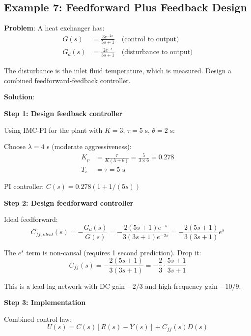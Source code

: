\subsection{Example 7: Feedforward Plus Feedback Design}
\label{subsec:ex_ff_fb}

\textbf{Problem}: A heat exchanger has:
\begin{align}
G(s) &= \frac{3e^{-2s}}{5s + 1} \quad \text{(control to output)} \\
G_d(s) &= \frac{2e^{-s}}{3s + 1} \quad \text{(disturbance to output)}
\end{align}

The disturbance is the inlet fluid temperature, which is measured. Design a combined feedforward-feedback controller.

\textbf{Solution}:

\textbf{Step 1: Design feedback controller}

Using IMC-PI for the plant with $K = 3$, $\tau = 5$ s, $\theta = 2$ s:

Choose $\lambda = 4$ s (moderate aggressiveness):
\begin{align}
K_p &= \frac{\tau}{K(\lambda + \theta)} = \frac{5}{3 \times 6} = 0.278 \\
T_i &= \tau = 5 \text{ s}
\end{align}

PI controller: $C(s) = 0.278(1 + 1/(5s))$

\textbf{Step 2: Design feedforward controller}

Ideal feedforward:
\begin{equation}
C_{ff,ideal}(s) = -\frac{G_d(s)}{G(s)} = -\frac{2(5s+1)e^{-s}}{3(3s+1)e^{-2s}} = -\frac{2(5s+1)}{3(3s+1)} e^{s}
\end{equation}

The $e^{s}$ term is non-causal (requires 1 second prediction). Drop it:
\begin{equation}
C_{ff}(s) = -\frac{2(5s+1)}{3(3s+1)} = -\frac{2}{3} \cdot \frac{5s+1}{3s+1}
\end{equation}

This is a lead-lag network with DC gain $-2/3$ and high-frequency gain $-10/9$.

\textbf{Step 3: Implementation}

Combined control law:
\begin{equation}
U(s) = C(s)[R(s) - Y(s)] + C_{ff}(s) D(s)
\end{equation}


